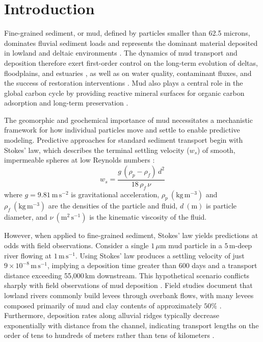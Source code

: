 \documentclass{agujournal2019}
\begin{document}
\section{Introduction}

Fine-grained sediment, or mud, defined by particles smaller than 62.5 microns, dominates fluvial sediment loads and represents the dominant material deposited in lowland and deltaic environments \cite{healy2002muddy, kranenburg1994fractal, lamb2020mud}. The dynamics of mud transport and deposition therefore exert first-order control on the long-term evolution of deltas, floodplains, and estuaries \cite{nghiem2022mechanistic, winterwerp2002flocculation}, as well as on water quality, contaminant fluxes, and the success of restoration interventions \cite{droppo1997freshwater, esposito2017efficient, kemp2016enhancing, liss1996floc}. Mud also plays a central role in the global carbon cycle by providing reactive mineral surfaces for organic carbon adsorption and long-term preservation \cite{bianchi2024anthropogenic, blair2012fate}.

The geomorphic and geochemical importance of mud necessitates a mechanistic framework for how individual particles move and settle to enable predictive modeling. Predictive approaches for standard sediment transport begin with Stokes' law, which describes the terminal settling velocity ($w_s$) of smooth, impermeable spheres at low Reynolds numbers \cite{bird2006transport, stokes1851effect}:
\begin{equation}
w_s = \frac{g\,(\rho_p - \rho_f)\,d^2}{18\,\rho_f\,\nu}
    \label{eq:stokes}
\end{equation}
where $g = 9.81\ \mathrm{m\,s^{-2}}$ is gravitational acceleration, $\rho_p\ (\mathrm{kg\,m^{-3}})$ and $\rho_f\ (\mathrm{kg\,m^{-3}})$ are the densities of the particle and fluid, $d\ (\mathrm{m})$ is particle diameter, and $\nu\ (\mathrm{m^2\,s^{-1}})$ is the kinematic viscosity of the fluid. 

However, when applied to fine-grained sediment, Stokes' law yields predictions at odds with field observations. Consider a single $1\,\mu\mathrm{m}$ mud particle in a $5$\,m-deep river flowing at $1\,\mathrm{m\,s}^{-1}$. Using Stokes’ law produces a settling velocity of just $9\times 10^{-8}\,\mathrm{m\,s}^{-1}$, implying a deposition time greater than 600 days and a transport distance exceeding 55,000\,km downstream. This hypothetical scenario conflicts sharply with field observations of mud deposition \cite{lamb2020mud}. Field studies document that lowland rivers commonly build levees through overbank flows, with many levees composed primarily of mud and clay contents of approximately $50\%$ \cite{aalto2008spatial}. Furthermore, deposition rates along alluvial ridges typically decrease exponentially with distance from the channel, indicating transport lengths on the order of tens to hundreds of meters rather than tens of kilometers \cite{hajek2012simplified}.
\end{document}
